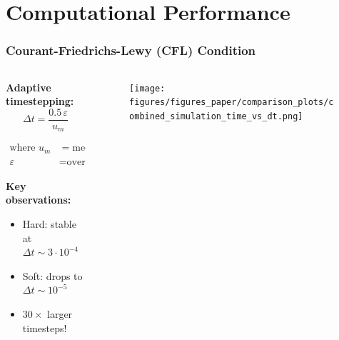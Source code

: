 \documentclass[10pt,t]{beamer}
\begin{document}

\section{Computational Performance}

\begin{frame}
    \frametitle{Courant-Friedrichs-Lewy (CFL) Condition}

    \begin{columns}
        \begin{column}{0.52\textwidth}
            \textbf{Adaptive timestepping:}
            \begin{equation*}
                \Delta t = \frac{0.5 \, \varepsilon}{u_m}
            \end{equation*}

            \vspace{-0.5cm}

            \begin{equation*}
                \begin{align}
                    \text{where }   u_m & = \text{median velocity},  \\
                    \varepsilon         & = \text{overlap tolerance}
                \end{align}
            \end{equation*}

            \textbf{Key observations:}
            \begin{itemize}
                \item Hard: stable at $\Delta t \sim 3 \cdot 10^{-4}$
                \item Soft: drops to $\Delta t \sim 10^{-5}$
                \item $30\times$ larger timesteps!
            \end{itemize}
        \end{column}

        \begin{column}{0.52\textwidth}
            \begin{figure}
                \centering
                \texttt{[image: figures/figures\_paper/comparison\_plots/combined\_simulation\_time\_vs\_dt.png]}
            \end{figure}
        \end{column}
    \end{columns}

\end{frame}
\end{document}
